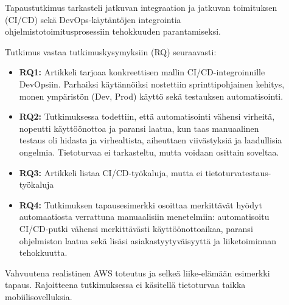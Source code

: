 \documentclass[bscthesis,finnish,oneside,biblatex]{uefcsthesis}
\begin{document}
    \begin{description}
        \item[\cite{chatterjee2024_operational_efficiency}] Tapaustutkimus tarkasteli jatkuvan integraation ja jatkuvan toimituksen (CI/CD) sekä DevOps-käytäntöjen integrointia ohjelmistotoimitusprosessiin tehokkuuden parantamiseksi.

        Tutkimus vastaa tutkimuskysymyksiin (RQ) seuraavasti:
        \begin{itemize}
            \item \textbf{RQ1:} Artikkeli tarjoaa konkreettisen mallin CI/CD-integroinnille DevOpsiin. Parhaiksi käytännöiksi nostettiin sprinttipohjainen kehitys, monen ympäristön (Dev, Prod) käyttö sekä testauksen automatisointi.
            \item \textbf{RQ2:} Tutkimuksessa todettiin, että automatisointi vähensi virheitä, nopeutti käyttöönottoa ja paransi laatua, kun taas manuaalinen testaus oli hidasta ja virhealtista, aiheuttaen viivästyksiä ja laadullisia ongelmia. Tietoturvaa ei tarkasteltu, mutta voidaan osittain soveltaa.
            \item \textbf{RQ3:} Artikkeli listaa CI/CD-työkaluja, mutta ei tietoturvatestaus-työkaluja
            \item \textbf{RQ4:} Tutkimuksen tapausesimerkki osoittaa merkittävät hyödyt automaatiosta verrattuna manuaalisiin menetelmiin: automatisoitu CI/CD-putki vähensi merkittävästi käyttöönottoaikaa, paransi ohjelmiston laatua sekä lisäsi asiakastyytyväisyyttä ja liiketoiminnan tehokkuutta.
        \end{itemize}

        Vahvuutena realistinen AWS toteutus ja selkeä liike-elämään esimerkki tapaus. Rajoitteena tutkimuksessa ei käsitellä tietoturvaa taikka mobiilisovelluksia.
    \end{description}
\end{document}
